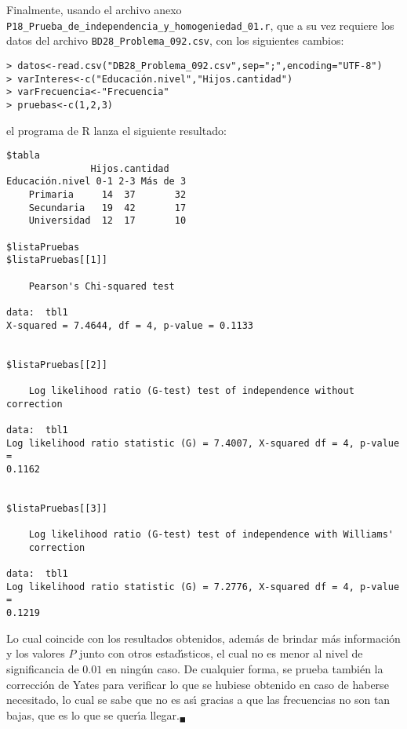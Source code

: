 \begin{solucion}
 Finalmente, usando el archivo anexo
 \texttt{P18\_Prueba\_de\_independencia\_y\_homogeniedad\_01.r},
 que a su vez requiere los datos del archivo
 \texttt{BD28\_Problema\_092.csv}, con los siguientes cambios:
 \begin{verbatim}
> datos<-read.csv("DB28_Problema_092.csv",sep=";",encoding="UTF-8")
> varInteres<-c("Educación.nivel","Hijos.cantidad")
> varFrecuencia<-"Frecuencia"
> pruebas<-c(1,2,3)
 \end{verbatim}
 el programa de R lanza el siguiente resultado:
 \begin{verbatim}
$tabla
               Hijos.cantidad
Educación.nivel 0-1 2-3 Más de 3
    Primaria     14  37       32
    Secundaria   19  42       17
    Universidad  12  17       10

$listaPruebas
$listaPruebas[[1]]

	Pearson's Chi-squared test

data:  tbl1
X-squared = 7.4644, df = 4, p-value = 0.1133


$listaPruebas[[2]]

	Log likelihood ratio (G-test) test of independence without correction

data:  tbl1
Log likelihood ratio statistic (G) = 7.4007, X-squared df = 4, p-value =
0.1162


$listaPruebas[[3]]

	Log likelihood ratio (G-test) test of independence with Williams'
	correction

data:  tbl1
Log likelihood ratio statistic (G) = 7.2776, X-squared df = 4, p-value =
0.1219
 \end{verbatim}
 \vspace{-0.5cm}
 Lo cual coincide con los resultados obtenidos, adem\'as de brindar m\'as
 informaci\'on y los valores $P$ junto con otros estad\'{\i}sticos, 
 el cual no es menor al nivel de significancia de $0.01$ en ning\'un caso.
 De cualquier forma, se prueba tambi\'en la correcci\'on de Yates
 para verificar lo que se hubiese obtenido en caso de haberse necesitado,
 lo cual se sabe que no es as\'{\i} gracias a que las frecuencias no son
 tan bajas, que es lo que se quer\'{\i}a llegar.${}_{\blacksquare}$
\end{solucion}
